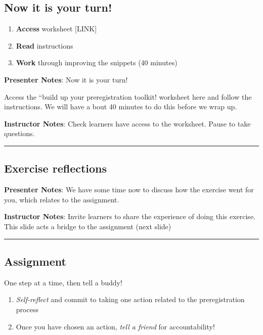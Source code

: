 \documentclass[
  letterpaper,
  DIV=11,
  numbers=noendperiod]{scrartcl}
\providecommand{\tightlist}{%
  \setlength{\itemsep}{0pt}\setlength{\parskip}{0pt}}
\begin{document}
\subsection{Now it is your turn!}\label{now-it-is-your-turn}

\begin{enumerate}
\def\labelenumi{\arabic{enumi}.}
\tightlist
\item
  \textbf{Access} worksheet {[}LINK{]}
\item
  \textbf{Read} instructions
\item
  \textbf{Work} through improving the snippets (40 minutes)
\end{enumerate}

\textbf{Presenter Notes}: Now it is your turn!

Access the ``build up your preregistration toolkit! worksheet here and
follow the instructions. We will have a bout 40 minutes to do this
before we wrap up.

\textbf{Instructor Notes}: Check learners have access to the worksheet.
Pause to take questions.

\begin{center}\rule{0.5\linewidth}{0.5pt}\end{center}

\subsection{Exercise reflections}\label{exercise-reflections}

\textbf{Presenter Notes}: We have some time now to discuss how the
exercise went for you, which relates to the assignment.

\textbf{Instructor Notes}: Invite learners to share the experience of
doing this exercise. This slide acts a bridge to the assignment (next
slide)

\begin{center}\rule{0.5\linewidth}{0.5pt}\end{center}

\subsection{Assignment}\label{assignment}

One step at a time, then tell a buddy!

\begin{enumerate}
\def\labelenumi{\arabic{enumi}.}
\tightlist
\item
  \emph{Self-reflect} and commit to taking one action related to the
  preregistration process
\item
  Once you have chosen an action, \emph{tell a friend} for
  accountability!
\end{enumerate}
\end{document}

